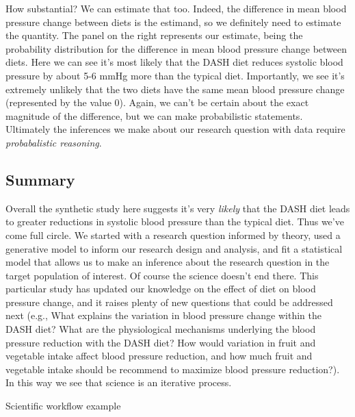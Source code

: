 \documentclass[
]{book}
\begin{document}
How substantial? We can estimate that too. Indeed, the difference in mean blood pressure change between diets is the estimand, so we definitely need to estimate the quantity. The panel on the right represents our estimate, being the probability distribution for the difference in mean blood pressure change between diets. Here we can see it's most likely that the DASH diet reduces systolic blood pressure by about 5-6 mmHg more than the typical diet. Importantly, we see it's extremely unlikely that the two diets have the same mean blood pressure change (represented by the value 0). Again, we can't be certain about the exact magnitude of the difference, but we can make probabilistic statements. Ultimately the inferences we make about our research question with data require \emph{probabalistic reasoning}.

\subsection{Summary}\label{summary}

Overall the synthetic study here suggests it's very \emph{likely} that the DASH diet leads to greater reductions in systolic blood pressure than the typical diet. Thus we've come full circle. We started with a research question informed by theory, used a generative model to inform our research design and analysis, and fit a statistical model that allows us to make an inference about the research question in the target population of interest. Of course the science doesn't end there. This particular study has updated our knowledge on the effect of diet on blood pressure change, and it raises plenty of new questions that could be addressed next (e.g., What explains the variation in blood pressure change within the DASH diet? What are the physiological mechanisms underlying the blood pressure reduction with the DASH diet? How would variation in fruit and vegetable intake affect blood pressure reduction, and how much fruit and vegetable intake should be recommend to maximize blood pressure reduction?). In this way we see that science is an iterative process.

Scientific workflow example
\end{document}
